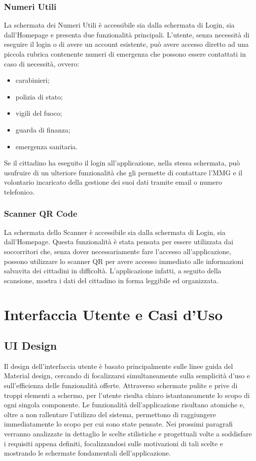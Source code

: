 \documentclass[12pt,a4paper,twoside,openright,titlepage]{book}
\begin{document}
\subsection{Numeri Utili}
La schermata dei Numeri Utili è accessibile sia dalla schermata di Login, sia dall'Homepage e presenta due funzionalità principali. L'utente, senza necessità di eseguire il login o di avere un account esistente, può avere accesso diretto ad una piccola rubrica contenente numeri di emergenza che possono essere contattati in caso di necessità, ovvero:
\begin{itemize}
\item carabinieri;
\item polizia di stato;
\item vigili del fuoco;
\item guarda di finanza;
\item emergenza sanitaria.
\end{itemize}
Se il cittadino ha eseguito il login all'applicazione, nella stessa schermata, può usufruire di un ulteriore funzionalità che gli permette di contattare l'MMG e il volontario incaricato della gestione dei suoi dati tramite email o numero telefonico.

\subsection{Scanner QR Code}
La schermata dello Scanner è accessibile sia dalla schermata di Login, sia dall'Homepage. Questa funzionalità è stata pensata per essere utilizzata dai soccorritori che, senza dover necessariamente fare l'accesso all'applicazione, possono utilizzare lo scanner QR per avere accesso immediato alle informazioni salvavita dei cittadini in difficoltà. L'applicazione infatti, a seguito della scansione, mostra i dati del cittadino in forma leggibile ed organizzata.

\chapter{Interfaccia Utente e Casi d'Uso}
\section{UI Design}
Il design dell'interfaccia utente è basato principalmente sulle linee guida del Material design, cercando di focalizzarsi simultaneamente sulla semplicità d'uso e sull'efficienza delle funzionalità offerte. Attraverso schermate pulite e prive di troppi elementi a schermo, per l'utente risulta chiaro istantaneamente lo scopo di ogni singola componente. Le funzionalità dell'applicazione risultano atomiche e, oltre a non rallentare l'utilizzo del sistema, permettono di raggiungere immediatamente lo scopo per cui sono state pensate. Nei prossimi paragrafi verranno analizzate in dettaglio le scelte stilistiche e progettuali volte a soddisfare i requisiti appena definiti, focalizzandosi sulle motivazioni di tali scelte e mostrando le schermate fondamentali dell'applicazione.
\end{document}
